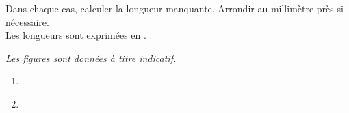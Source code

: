     Dans chaque cas, calculer la longueur manquante. Arrondir au millimètre près si nécessaire.\\
    Les longueurs sont exprimées en \Lg{}.

    {\it Les figures sont données à titre indicatif.}

    \begin{enumerate}
        \item \phantom{rrr}\\
        \begin{minipage}{0.15\linewidth}
        \end{minipage}
        \begin{minipage}{0.8\linewidth}
            {\red {}}
        \end{minipage}
        \item \phantom{rrr}\\
        \begin{minipage}{0.15\linewidth}
        \end{minipage}
        \begin{minipage}{0.8\linewidth}
            {\red {}}
        \end{minipage}
    \end{enumerate}
